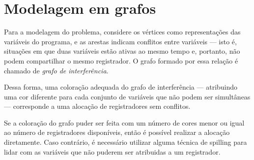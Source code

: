 \section{Modelagem em grafos}

Para a modelagem do problema, considere os vértices como representações das variáveis do programa,
e as arestas indicam conflitos entre variáveis — isto é, situações em que duas variáveis estão ativas
ao mesmo tempo e, portanto, não podem compartilhar o mesmo registrador. O grafo formado por essa relação
é chamado de \textit{grafo de interferência}.

Dessa forma, uma coloração adequada do grafo de interferência — atribuindo uma cor diferente
para cada conjunto de variáveis que não podem ser simultâneas — corresponde a uma alocação de registradores sem conflitos.

Se a coloração do grafo puder ser feita com um número de cores menor ou igual ao número de registradores disponíveis,
então é possível realizar a alocação diretamente. Caso contrário, é necessário utilizar alguma técnica de spilling para
lidar com as variáveis que não puderem ser atribuidas a um registrador.
